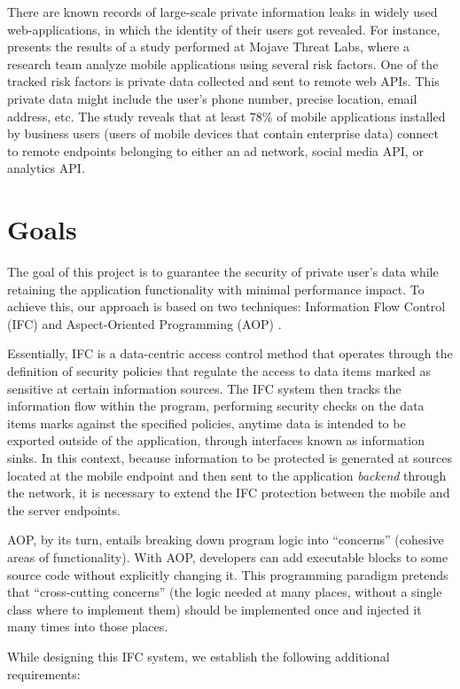 There are known records of large-scale private information leaks in widely used web-applications, in which the identity of their users got revealed. For instance, \cite{mojave2014} presents the results of a study performed at Mojave Threat Labs, where a research team analyze mobile applications using several risk factors. One of the tracked risk factors is private data collected and sent to remote web APIs. This private data might include the user's phone number, precise location, email address, etc. The study reveals that at least 78\% of mobile applications installed by business users (users of mobile devices that contain enterprise data) connect to remote endpoints belonging to either an ad network, social media API, or analytics API.

\section{Goals}

The goal of this project is to guarantee the security of private user's data while retaining the application functionality with minimal performance impact. To achieve this, our approach is based on two techniques: Information Flow Control (IFC) and Aspect-Oriented Programming (AOP) \cite{aop}. 

Essentially, IFC is a data-centric access control method that operates through the definition of security policies that regulate the access to data items marked as sensitive at certain information sources. The IFC system then tracks the information flow within the program, performing security checks on the data items marks against the specified policies, anytime data is intended to be exported outside of the application, through interfaces known as information sinks. In this context, because information to be protected is generated at sources located at the mobile endpoint and then sent to the application \textit{backend} through the network, it is necessary to extend the IFC protection between the mobile and the server endpoints. 

AOP, by its turn, entails breaking down program logic into ``concerns'' (cohesive areas of functionality). With AOP, developers can add executable blocks to some source code without explicitly changing it. This programming paradigm pretends that ``cross-cutting concerns'' (the logic needed at many places, without a single class where to implement them) should be implemented once and injected it many times into those places.

While designing this IFC system, we establish the following additional requirements:

